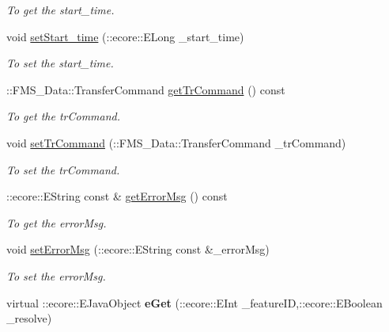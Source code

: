 \begin{DoxyCompactItemize}
\begin{DoxyCompactList}\small\item\em To get the start\_\-time. \item\end{DoxyCompactList}\item 
void \hyperlink{classFMS__Data_1_1FileTransfer_abf57e1e8ed2f712a0961ed0769d7efdd}{setStart\_\-time} (::ecore::ELong \_\-start\_\-time)
\begin{DoxyCompactList}\small\item\em To set the start\_\-time. \item\end{DoxyCompactList}\item 
::FMS\_\-Data::TransferCommand \hyperlink{classFMS__Data_1_1FileTransfer_ab18e9580c06f9f2ffc194b04a78ab813}{getTrCommand} () const 
\begin{DoxyCompactList}\small\item\em To get the trCommand. \item\end{DoxyCompactList}\item 
void \hyperlink{classFMS__Data_1_1FileTransfer_a26f9e051ed78e6c20f7799bb4b5b33de}{setTrCommand} (::FMS\_\-Data::TransferCommand \_\-trCommand)
\begin{DoxyCompactList}\small\item\em To set the trCommand. \item\end{DoxyCompactList}\item 
::ecore::EString const \& \hyperlink{classFMS__Data_1_1FileTransfer_a57ebd38d06b979cc783e97e0469a18b7}{getErrorMsg} () const 
\begin{DoxyCompactList}\small\item\em To get the errorMsg. \item\end{DoxyCompactList}\item 
void \hyperlink{classFMS__Data_1_1FileTransfer_af57dc5a2c599b0a3c8d9b4d05ee63ef2}{setErrorMsg} (::ecore::EString const \&\_\-errorMsg)
\begin{DoxyCompactList}\small\item\em To set the errorMsg. \item\end{DoxyCompactList}\item 
\hypertarget{classFMS__Data_1_1FileTransfer_ae82ba526b4e042c9510db626d710ce96}{
virtual ::ecore::EJavaObject {\bfseries eGet} (::ecore::EInt \_\-featureID,::ecore::EBoolean \_\-resolve)}
\label{classFMS__Data_1_1FileTransfer_ae82ba526b4e042c9510db626d710ce96}


\end{DoxyCompactItemize}
